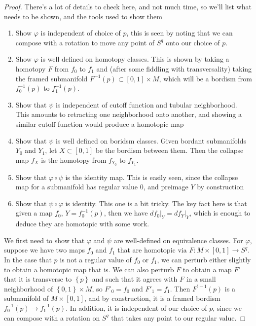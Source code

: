 \documentclass[psamsfonts]{amsart}
\theoremstyle{definition}
\theoremstyle{remark}
\newcommand{\inv}{^{-1}}
\newcommand{\set}[1]{\left\lbrace #1 \right\rbrace}
\begin{document}
\begin{proof}
There's a lot of details to check here, and not much time, so we'll list what needs to be shown, and the tools used to show them
\begin{enumerate}
\item Show $\varphi$ is independent of choice of $p$, this is seen by noting that we can compose with a rotation to move any point of $S^q$ onto our choice of $p$.
\item Show $\varphi$ is well defined on homotopy classes. This is shown by taking a homotopy $F$ from $f_0$ to $f_1$ and (after some fiddling with transversality) taking the framed submanifold $F\inv(p) \subset [0,1] \times M$, which will be a bordism from $f_0\inv(p)$ to $f_1\inv(p)$.
\item Show that $\psi$ is independent of cutoff function and tubular neighborhood. This amounts to retracting one neighborhood onto another, and showing a similar cutoff function would produce a homotopic map
\item Show that $\psi$ is well defined on boridsm classes. Given bordant submanifolds $Y_0$ and $Y_1$, let $X \subset [0,1]$ be the bordism between them. Then the collapse map $f_X$ is the homotopy from $f_{Y_0}$ to $f_{Y_1}$.
\item Show that $\varphi \circ \psi$ is the identity map. This is easily seen, since the collapse map for a submanifold has regular value $0$, and preimage $Y$ by construction
\item Show that $\psi \circ \varphi$ is identity. This one is a bit tricky. The key fact here is that given a map $f_0$, $Y = f_0\inv(p)$, then we have $df_0\vert_Y = df_Y\vert_Y$, which is enough to deduce they are homotopic with some work.
\end{enumerate}
\iffalse
We first need to show that $\varphi$ and $\psi$ are well-defined on equivalence classes. For $\varphi$, suppose we have two maps $f_0$ and $f_1$ that are homotopic via $F : M \times [0,1] \to S^q$. In the case that $p$ is not a regular value of $f_0$ or $f_1$, we can perturb either slightly to obtain a homotopic map that is. We can also perturb $F$ to obtain a map $F'$ that it is transverse to $\set{p}$ and such that it agrees with $F$ in a small neighborhood of $\set{0,1} \times M$, so $F'_0 = f_0$ and $F'_1 = f_1$. Then $F^{'-1}(p)$ is a submanifold of $M \times [0,1]$, and by construction, it is a framed bordism $f_0\inv(p) \to f_1\inv(p)$. In addition, it is independent of our choice of $p$, since we can compose with a rotation on $S^q$ that takes any point to our regular value.


\end{proof}
\end{document}
